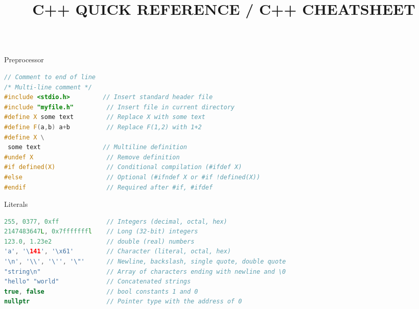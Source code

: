 \documentclass[final]{beamer}
\title{C++ QUICK REFERENCE / C++ CHEATSHEET}
\begin{document}
\begin{frame}[t,fragile]

\begin{columns}[t,totalwidth=0.95\paperwidth, colsep=0.05\paperwidth]

\begin{column}{0.3\paperwidth}

\begin{block}{Preprocessor}
\begin{lstlisting}[language=C++]
// Comment to end of line
/* Multi-line comment */
#include <stdio.h>         // Insert standard header file
#include "myfile.h"         // Insert file in current directory
#define X some text         // Replace X with some text
#define F(a,b) a+b          // Replace F(1,2) with 1+2
#define X \
 some text                 // Multiline definition
#undef X                    // Remove definition
#if defined(X)              // Conditional compilation (#ifdef X)
#else                       // Optional (#ifndef X or #if !defined(X))
#endif                      // Required after #if, #ifdef
\end{lstlisting}
\end{block}



\begin{block}{Literals}
\begin{lstlisting}[language=C++]
255, 0377, 0xff             // Integers (decimal, octal, hex)
2147483647L, 0x7fffffffl    // Long (32-bit) integers
123.0, 1.23e2               // double (real) numbers
'a', '\141', '\x61'         // Character (literal, octal, hex)
'\n', '\\', '\'', '\"'      // Newline, backslash, single quote, double quote
"string\n"                  // Array of characters ending with newline and \0
"hello" "world"             // Concatenated strings
true, false                 // bool constants 1 and 0
nullptr                     // Pointer type with the address of 0
\end{lstlisting}
\end{block}



\end{column}
\end{columns}
\end{frame}
\end{document}
